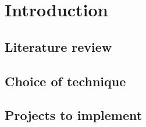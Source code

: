 \chapter{Introduction}
\label{cha:introduction}
\section{Literature review}
\label{sec:review}

\section{Choice of technique}
\label{sec:choice}

\section{Projects to implement}
\label{sec:projects}